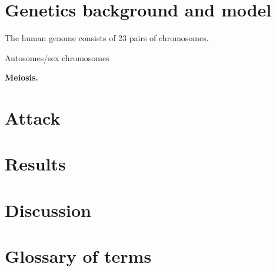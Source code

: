 \documentclass{article}
\begin{document}
\section{Genetics background and model}
The human genome consists of 23 pairs of chromosomes. 

Autosomes/sex chromosomes

{\bf Meiosis.}

\section{Attack}

\section{Results}

\section{Discussion}

\section{Glossary of terms}

\label{intro}
\end{document}
